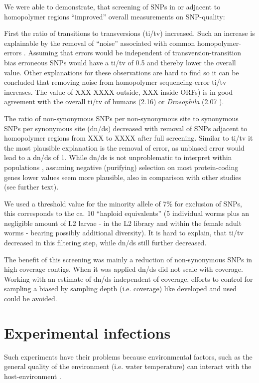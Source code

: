 We were able to demonstrate, that screening of SNPs in or adjacent to
homopolymer regions ``improved'' overall measurements on SNP-quality:

First the ratio of transitions to transversions (ti/tv) increased.
Such an increase is explainable by the removal of ``noise'' associated
with common homopolymer-errors \cite{pmid21685085}. Assuming that
errors would be independent of transversion-transition bias erroneous
SNPs would have a ti/tv of 0.5 and thereby lower the overall
value. Other explanations for these observations are hard to find so
it can be concluded that removing noise from homopolymer
sequencing-error ti/tv increases.  The value of XXX XXXX outside, XXX
inside ORFs) is in good agreement with the overall ti/tv of humans
(2.16) or \textit{Drosophila} (2.07 \cite{pmid21143862}).

The ratio of non-synonymous SNPs per non-synonymous site to synonymous
SNPs per synonymous site (dn/ds) decreased with removal of SNPs
adjacent to homopolymer regions from XXX  to
XXXX after full screening. Similar to ti/tv it the most
plausible explanation is the removal of error, as unbiased error would
lead to a dn/ds of 1. While dn/ds is not unproblematic to interpret
within populations \cite{pmid19081788}, assuming negative (purifying)
selection on most protein-coding genes lower values seem more
plausible, also in comparison with other studies (see further text).

We used a threshold value for the minority allele of 7\% for exclusion
of SNPs, this corresponds to the ca. 10 ``haploid equivalents'' (5
individual worms plus an negligible amount of L2 larvae - in the L2
library and within the female adult worms - bearing possibly
additional diversity). It is hard to explain, that ti/tv decreased in
this filtering step, while dn/ds still further decreased.

The benefit of this screening was mainly a reduction of non-synonymous
SNPs in high coverage contigs. When it was applied dn/ds did not
scale with coverage. Working with an estimate of dn/ds independent of
coverage, efforts to control for sampling a biased by sampling depth
(i.e. coverage) like developed \cite{pmid18590545} and used
\cite{pmid20478048} could be avoided.  

\section{Experimental infections}
\label{sec:exp-inf}

Such experiments have their problems because environmental factors,
such as the general quality of the environment (i.e. water
temperature) can interact with the host-environment
\cite{kaltz_shykoff_rev}.

